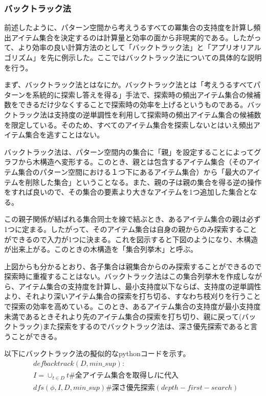 \documentclass[dvipdfmx]{jsarticle}
\begin{document}
\subsubsection{バックトラック法}
前述したように、パターン空間から考えうるすべての冪集合の支持度を計算し頻出アイテム集合を決定するのは計算量と効率の面から非現実的である。したがって、より効率の良い計算方法のとして「バックトラック法」と「アプリオリアルゴリズム」を先に例示した。ここではバックトラック法についての具体的な説明を行う。\par
まず、バックトラック法とはなにか。バックトラック法とは「考えうるすべてパターンを系統的に探索し答えを得る」手法で、探索時の頻出アイテム集合の候補数をできるだけ少なくすることで探索時の効率を上げるというものである。バックトラック法は支持度の逆単調性を利用して探索時の頻出アイテム集合の候補数を限定している。そのため、すべてのアイテム集合を探索しないとはいえ頻出アイテム集合を逃すことはない。\par
バックトラック法は、パターン空間内の集合に「親」を設定することによってグラフから木構造へ変形する。このとき、親とは包含するアイテム集合（そのアイテム集合のパターン空間における１つ下にあるアイテム集合）から「最大のアイテムを削除した集合」ということなる。また、親の子は親の集合を得る逆の操作をすれば良いので、その集合の要素より大きなアイテムを1つ追加した集合となる。\par
この親子関係が結ばれる集合同士を線で結ぶとき、あるアイテム集合の親は必ず1つに定まる。したがって、そのアイテム集合は自身の親からのみ探索することができるので入力が1つに決まる。これを図示すると下図のようになり、木構造が出来上がる。このときの木構造を「集合列挙木」と呼ぶ。\par
上図からも分かるとおり、各子集合は親集合からのみ探索することができるので探索時に重複することはない。バックトラック法はこの集合列挙木を作成しながら、アイテム集合の支持度を計算し、最小支持度以下ならば、支持度の逆単調性より、それより深いアイテム集合の探索を打ち切る、すなわち枝刈りを行うことで探索の効率を高めている。このとき、あるアイテム集合の支持度が最小支持度未満であるときそれより先のアイテム集合の探索を打ち切り、親に戻って(バックトラック)また探索をするのでバックトラック法は、深さ優先探索であると言うことができる。\par
以下にバックトラック法の擬似的なpythonコードを示す。
\begin{align*}
  &def　backtrack(D, min\_sup): \\
  &　I = \cup_{t \in D}t　\#全アイテム集合を取得しIに代入\\
  &　dfs(\phi, I, D, min\_sup)　\#深さ優先探索(depth-first-search) \\
\end{align*}
\end{document}

